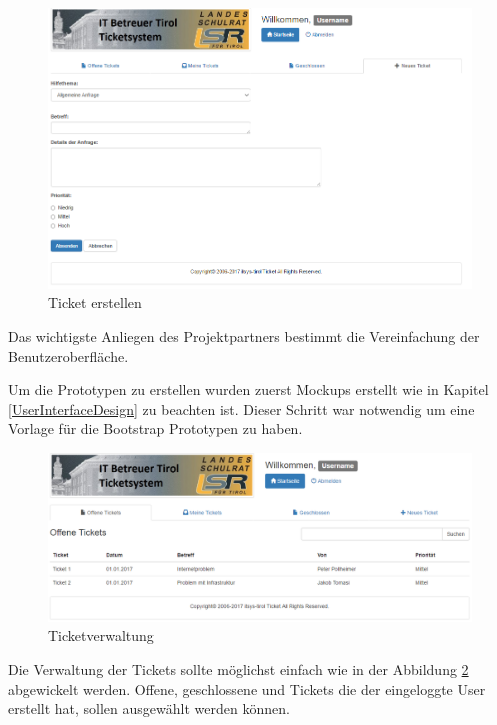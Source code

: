 	\paragraph{}
	\begin{figure}[h]
		\centering
		\includegraphics[scale=0.6]{figures/newTicket.png}
		\caption{Ticket erstellen}
		\label{Ein Ticket erstellen}
	\end{figure}


Das wichtigste Anliegen des Projektpartners bestimmt die Vereinfachung der Benutzeroberfläche.

	\newpage
	Um die Prototypen zu erstellen wurden zuerst Mockups erstellt wie in Kapitel \ref{UserInterfaceDesign} zu beachten ist. Dieser Schritt war notwendig um eine Vorlage für die Bootstrap Prototypen zu haben.
	
	\begin{figure}[h]
		\centering
		\includegraphics[scale=0.52]{figures/index.png}
		\caption{Ticketverwaltung}
		\label{Tickets verwalten}
	\end{figure}
Die Verwaltung der Tickets sollte möglichst einfach wie in der Abbildung \ref{Tickets verwalten} abgewickelt werden. Offene, geschlossene und Tickets die der eingeloggte User erstellt hat, sollen ausgewählt werden können.